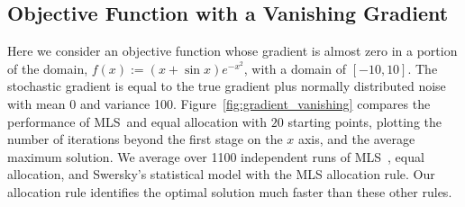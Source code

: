 \documentclass{wscpaperproc}
\theoremstyle{wsc}
\newcommand{\abbrv}{MLS}
\begin{document}
\subsection{Objective Function with a Vanishing Gradient}
\label{gradient_vanishing}

Here we consider an objective function whose gradient is almost zero in a portion of the domain, $f(x):=(x+\sin{x})e^{-x^{2}}$, with a domain of $[-10,10]$. The stochastic gradient is equal to the true gradient plus normally distributed noise with mean 0 and variance 100.
Figure~\ref{fig:gradient_vanishing} compares the performance of \abbrv\ and equal allocation with $20$ starting points, plotting the number of iterations beyond the first stage on the $x$ axis, and the average maximum solution. We average over 1100 independent runs of \abbrv\ , equal allocation, and Swersky's statistical model with the MLS allocation rule. Our allocation rule identifies the optimal solution much faster than these other rules.
\end{document}
